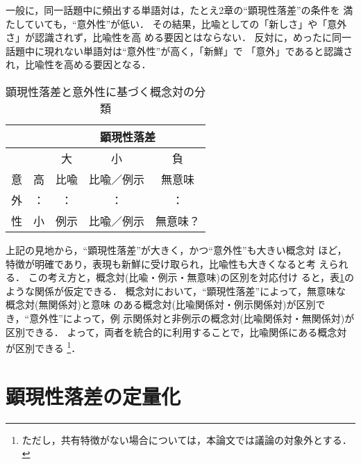 一般に，同一話題中に頻出する単語対は，たとえ2章の``顕現性落差''の条件を
満たしていても，``意外性''が低い．
その結果，比喩としての「新しさ」や「意外さ」が認識されず，比喩性を高
める要因とはならない．
反対に，めったに同一話題中に現れない単語対は``意外性''が高く，「新鮮」で
「意外」であると認識され，比喩性を高める要因となる．

\begin{table}[tb]
  \begin{center}
     \caption{顕現性落差と意外性に基づく概念対の分類}
     \label{tbl:relation}
\begin{tabular}{|c|c|c|c|c|}
\hline
   &           &\multicolumn{3}{|c|}{顕現性落差}\\
\hline
   &	&  大   & 小     	&  負\\
\hline
意 & 高 & 比喩 & 比喩／例示	& 無意味\\
\cline{2-5}
外 & ： & ：   & ： 		& ： 	\\
\cline{2-5}
性 & 小 & 例示  & 比喩／例示	& 無意味？ 	\\
\hline
\end{tabular}
  \end{center}
\end{table}

上記の見地から，``顕現性落差''が大きく，かつ``意外性''も大きい概念対
ほど，特徴が明確であり，表現も新鮮に受け取られ，比喩性も大きくなると考
えられる．
この考え方と，概念対(比喩・例示・無意味)の区別を対応付け
ると，表\ref{tbl:relation}のような関係が仮定できる．
概念対において，``顕現性落差''によって，無意味な概念対(無関係対)と意味
のある概念対(比喩関係対・例示関係対)が区別でき，``意外性''によって，例
示関係対と非例示の概念対(比喩関係対・無関係対)が区別できる．
よって，両者を統合的に利用することで，比喩関係にある概念対が区別できる
\footnote{
ただし，共有特徴がない場合については，本論文では議論の対象外とする．
}．

\section{顕現性落差の定量化}
